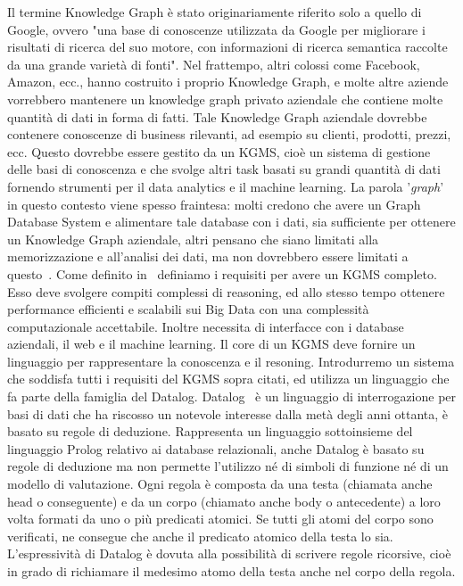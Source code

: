 Il termine Knowledge Graph è stato originariamente riferito solo a quello di Google, ovvero "una base di conoscenze utilizzata da Google per migliorare i risultati di ricerca del suo motore, con informazioni di ricerca semantica raccolte da una grande varietà di fonti". Nel frattempo, altri colossi come Facebook, Amazon, ecc., hanno costruito i proprio Knowledge Graph, e molte altre aziende vorrebbero mantenere un knowledge graph privato aziendale che contiene molte quantità di dati in forma di fatti. Tale Knowledge Graph aziendale dovrebbe contenere conoscenze di business rilevanti, ad esempio su clienti, prodotti, prezzi, ecc. Questo dovrebbe essere gestito da un KGMS, cioè un sistema di gestione delle basi di conoscenza e che svolge altri task basati su grandi quantità di dati fornendo strumenti per il data analytics e il machine learning. La parola '\textit{graph}' in questo contesto viene spesso fraintesa: molti credono che avere un Graph Database System e alimentare tale database con i dati, sia sufficiente per ottenere un Knowledge Graph aziendale, altri pensano che siano limitati alla memorizzazione e all'analisi dei dati, ma non dovrebbero essere limitati a questo~\cite{bellomarini2017swift}. \newline
Come definito in~\cite{bellomarini2017swift} definiamo i requisiti per avere un KGMS completo. Esso deve svolgere compiti complessi di reasoning, ed allo stesso tempo ottenere performance efficienti e scalabili sui Big Data con una complessit\`a computazionale accettabile. Inoltre necessita di interfacce con i database aziendali, il web e il machine learning. Il core di un KGMS deve fornire un linguaggio per rappresentare la conoscenza e il resoning.\newline \newline
Introdurremo un sistema che soddisfa tutti i requisiti del KGMS sopra citati, ed utilizza un linguaggio che fa parte della famiglia del Datalog. \newline
Datalog~\cite{atzeni2006basi} è un linguaggio di interrogazione per basi di dati che ha riscosso un notevole interesse dalla metà degli anni ottanta, è basato su regole di deduzione. Rappresenta un linguaggio sottoinsieme del linguaggio Prolog relativo ai database relazionali, anche Datalog è basato su regole di deduzione ma non permette l'utilizzo né di simboli di funzione né di un modello di valutazione. \newline
Ogni regola è composta da una testa (chiamata anche head o conseguente) e da un corpo (chiamato anche body o antecedente) a loro volta formati da uno o più predicati atomici. Se tutti gli atomi del corpo sono verificati, ne consegue che anche il predicato atomico della testa lo sia. L'espressività di Datalog è dovuta alla possibilità di scrivere regole ricorsive, cioè in grado di richiamare il medesimo atomo della testa anche nel corpo della regola. \newline
